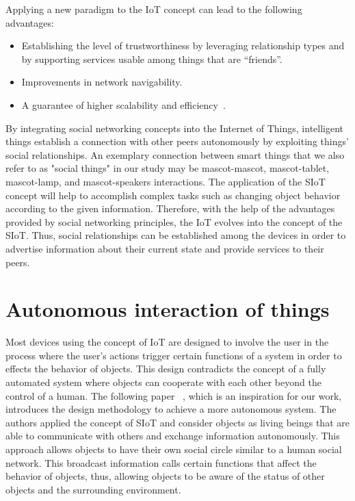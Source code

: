Applying a new paradigm to the IoT concept can lead to the following advantages:
\begin{itemize}
  \item Establishing the level of trustworthiness by leveraging relationship types and by
        supporting services usable among things that are “friends”.
  \item Improvements in network navigability.
  \item A guarantee of higher scalability and efficiency~\cite{atzori2012social}.
\end{itemize}

By integrating social networking concepts into the Internet of Things, intelligent things
establish a connection with other peers autonomously by exploiting things' social relationships.
An exemplary connection between smart things that we also refer to as "social things" in our
study may be mascot-mascot, mascot-tablet, mascot-lamp, and mascot-speakers interactions.
The application of the SIoT concept will help to accomplish complex tasks such as changing
object behavior according to the given information.
Therefore, with the help of the advantages provided by social networking principles,
the IoT evolves into the concept of the SIoT\@.
Thus, social relationships can be established among
the devices in order to advertise information about their current state and provide services to their peers.

\section{Autonomous interaction of things}
\label{sec:Autonomous interaction of things}
Most devices using the concept of IoT are designed to involve the user in the process
where the user's actions trigger certain functions of a system in order to effects the behavior of objects.
This design contradicts the concept of a fully automated system where objects
can cooperate with each other beyond the control of a human.
The following paper ~\cite{okada2016autonomous}, which is an inspiration for our work,
introduces the design methodology to achieve a more autonomous system.
The authors applied the concept of SIoT and consider objects as living beings that are
able to communicate with others and exchange information autonomously.
This approach allows objects to have their own social circle similar to a human social network.
This broadcast information calls certain functions that affect the behavior of objects,
thus, allowing objects to be aware of the status of other objects and the surrounding environment.

